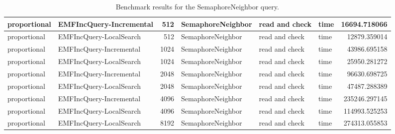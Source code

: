 \begin{table}
\begin{tabular}{| l | l | r | l | l | l | r |}
proportional & EMFIncQuery-Incremental & 512 & SemaphoreNeighbor & read and check & time & 16694.718066\\\hline
proportional & EMFIncQuery-LocalSearch & 512 & SemaphoreNeighbor & read and check & time & 12879.359014\\\hline
proportional & EMFIncQuery-Incremental & 1024 & SemaphoreNeighbor & read and check & time & 43986.695158\\\hline
proportional & EMFIncQuery-LocalSearch & 1024 & SemaphoreNeighbor & read and check & time & 25950.281272\\\hline
proportional & EMFIncQuery-Incremental & 2048 & SemaphoreNeighbor & read and check & time & 96630.698725\\\hline
proportional & EMFIncQuery-LocalSearch & 2048 & SemaphoreNeighbor & read and check & time & 47487.288389\\\hline
proportional & EMFIncQuery-Incremental & 4096 & SemaphoreNeighbor & read and check & time & 235246.297145\\\hline
proportional & EMFIncQuery-LocalSearch & 4096 & SemaphoreNeighbor & read and check & time & 114993.525253\\\hline
proportional & EMFIncQuery-LocalSearch & 8192 & SemaphoreNeighbor & read and check & time & 274313.055853\\\hline

\end{tabular}\caption{Benchmark results for the \textsf{SemaphoreNeighbor} query.}
\label{tab:first-validation-semaphoreneighbor}
\end{table}
